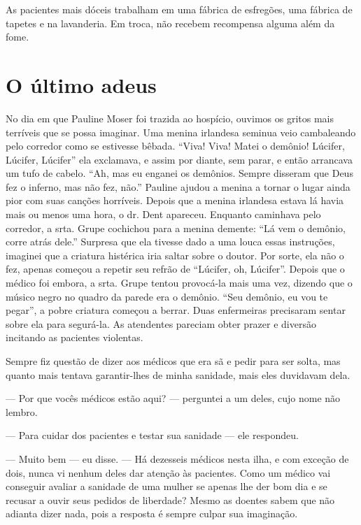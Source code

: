 As pacientes mais dóceis trabalham em uma fábrica de esfregões, uma
fábrica de tapetes e na lavanderia. Em troca, não recebem recompensa
alguma além da fome.

\label{section-10}

\chapter{O último
adeus}\label{capuxedtulo-xvi-o-uxfaltimo-adeus}

No dia em que Pauline Moser foi trazida ao hospício, ouvimos os gritos
mais terríveis que se possa imaginar. Uma menina irlandesa seminua veio
cambaleando pelo corredor como se estivesse bêbada. ``Viva! Viva!
Matei o demônio! Lúcifer, Lúcifer, Lúcifer'' ela exclamava, e assim
por diante, sem parar, e então arrancava um tufo de cabelo. ``Ah, mas
eu enganei os demônios. Sempre disseram que Deus fez o inferno, mas não
fez, não.'' Pauline ajudou a menina a tornar o lugar ainda pior com suas
canções horríveis. Depois que a menina irlandesa estava lá havia mais ou
menos uma hora, o dr. Dent apareceu. Enquanto caminhava pelo corredor, a
srta. Grupe cochichou para a menina demente: ``Lá vem o demônio,
corre atrás dele.'' Surpresa que ela tivesse dado a uma louca essas instruções,
imaginei que a criatura histérica iria saltar sobre o doutor. Por sorte,
ela não o fez, apenas começou a repetir seu refrão de ``Lúcifer, oh,
Lúcifer''. Depois que o médico foi embora, a srta. Grupe tentou
provocá-la mais uma vez, dizendo que o músico negro no quadro da parede
era o demônio. ``Seu demônio, eu vou te pegar'', a pobre criatura
começou a berrar. Duas enfermeiras precisaram sentar sobre ela para
segurá-la. As atendentes pareciam obter prazer e diversão incitando as
pacientes violentas.

Sempre fiz questão de dizer aos médicos que era sã e pedir para ser
solta, mas quanto mais tentava garantir-lhes de minha sanidade, mais
eles duvidavam dela.

--- Por que vocês médicos estão aqui? --- perguntei a um deles, cujo
nome não lembro.

--- Para cuidar dos pacientes e testar sua sanidade --- ele respondeu.

--- Muito bem --- eu disse. --- Há dezesseis médicos nesta ilha, e com
exceção de dois, nunca vi nenhum deles dar atenção às pacientes. Como um
médico vai conseguir avaliar a sanidade de uma mulher se apenas lhe der
bom dia e se recusar a ouvir seus pedidos de liberdade? Mesmo as doentes
sabem que não adianta dizer nada, pois a resposta é sempre culpar sua
imaginação. 

